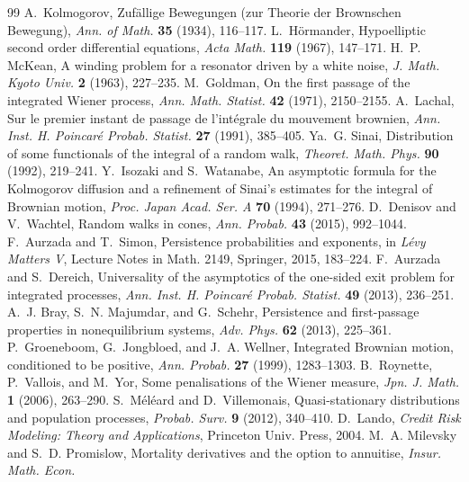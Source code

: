 \documentclass[11pt]{article}
\theoremstyle{definition}
\theoremstyle{remark}
\begin{document}
\begin{thebibliography}{99}\small
 A.~Kolmogorov, Zuf\"allige Bewegungen (zur Theorie der
Brownschen Bewegung), \emph{Ann. of Math.} \textbf{35} (1934), 116--117.
 L.~H\"ormander, Hypoelliptic second order differential
equations, \emph{Acta Math.} \textbf{119} (1967), 147--171.
 H.~P. McKean, A winding problem for a resonator driven
by a white noise, \emph{J. Math. Kyoto Univ.} \textbf{2} (1963),
227--235.
 M.~Goldman, On the first passage of the integrated
Wiener process, \emph{Ann. Math. Statist.} \textbf{42} (1971),
2150--2155.
 A.~Lachal, Sur le premier instant de passage de
l'int\'egrale du mouvement brownien, \emph{Ann. Inst. H. Poincar\'e
Probab. Statist.} \textbf{27} (1991), 385--405.
 Ya.~G. Sinai, Distribution of some functionals of the
integral of a random walk, \emph{Theoret. Math. Phys.} \textbf{90}
(1992), 219--241.
 Y.~Isozaki and S.~Watanabe, An asymptotic formula for
the Kolmogorov diffusion and a refinement of Sinai's estimates for the
integral of Brownian motion, \emph{Proc. Japan Acad. Ser. A}
\textbf{70} (1994), 271--276.
 D.~Denisov and V.~Wachtel, Random walks in cones,
\emph{Ann. Probab.} \textbf{43} (2015), 992--1044.
 F.~Aurzada and T.~Simon, Persistence probabilities and
exponents, in \emph{L\'evy Matters V}, Lecture Notes in Math. 2149,
Springer, 2015, 183--224.
 F.~Aurzada and S.~Dereich, Universality of the
asymptotics of the one-sided exit problem for integrated processes,
\emph{Ann. Inst. H. Poincar\'e Probab. Statist.} \textbf{49} (2013),
236--251.
 A.~J. Bray, S.~N. Majumdar, and G.~Schehr, Persistence
and first-passage properties in nonequilibrium systems, \emph{Adv.
Phys.} \textbf{62} (2013), 225--361.
 P.~Groeneboom, G.~Jongbloed, and J.~A. Wellner,
Integrated Brownian motion, conditioned to be positive, \emph{Ann.
Probab.} \textbf{27} (1999), 1283--1303.
 B.~Roynette, P.~Vallois, and M.~Yor, Some
penalisations of the Wiener measure, \emph{Jpn. J. Math.} \textbf{1}
(2006), 263--290.
 S.~M\'el\'eard and D.~Villemonais, Quasi-stationary
distributions and population processes, \emph{Probab. Surv.}
\textbf{9} (2012), 340--410.
 D.~Lando, \emph{Credit Risk Modeling: Theory and
Applications}, Princeton Univ. Press, 2004.
 M.~A. Milevsky and S.~D. Promislow, Mortality
derivatives and the option to annuitise, \emph{Insur. Math. Econ.}

\end{thebibliography}
\end{document}
